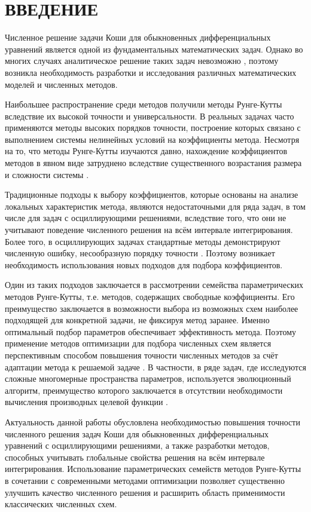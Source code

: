 \section{\centering ВВЕДЕНИЕ}
Численное решение задачи Коши для обыкновенных дифференциальных уравнений является одной из фундаментальных математических задач. Однако во многих случаях аналитическое решение таких задач невозможно \cite{Verzhbitsky}, поэтому возникла необходимость разработки и исследования различных математических моделей и численных методов. 

Наибольшее распространение среди методов получили методы Рунге-Кутты вследствие их высокой точности и универсальности. В реальных задачах часто применяются методы высоких порядков точности, построение которых связано с выполнением системы нелинейных условий на коэффициенты метода. Несмотря на то, что методы Рунге-Кутты изучаются давно, нахождение коэффициентов методов в явном виде затруднено вследствие существенного возрастания размера и сложности системы \cite{Demidovich}. 

Традиционные подходы к выбору коэффициентов, которые основаны на анализе локальных характеристик метода, являются недостаточными для ряда задач, в том числе для задач с осциллирующими решениями, вследствие того, что они не учитывают поведение численного решения на всём интервале интегрирования. Более того, в осциллирующих задачах стандартные методы демонстрируют численную ошибку, несообразную порядку точности \cite{article2023}. Поэтому возникает необходимость использования новых подходов для подбора коэффициентов.

Один из таких подходов заключается в рассмотрении семейства параметрических методов Рунге-Кутты, т.е. методов, содержащих свободные коэффициенты. Его преимущество заключается в возможности выбора из возможных схем наиболее подходящей для конкретной задачи, не фиксируя метод заранее. Именно оптимальный подбор параметров обеспечивает эффективность метода. Поэтому применение методов оптимизации для подбора численных схем является перспективным способом повышения точности численных методов за счёт адаптации метода к решаемой задаче \cite{article2023}. В частности, в ряде задач, где исследуются сложные многомерные пространства параметров, используется эволюционный алгоритм, преимущество которого заключается в отсутствии необходимости вычисления производных целевой функции \cite{article2025}.

Актуальность данной работы обусловлена необходимостью повышения точности численного решения задач Коши для обыкновенных дифференциальных уравнений с осциллирующими решениями, а также разработки методов, способных учитывать глобальные свойства решения на всём интервале интегрирования. Использование параметрических семейств методов Рунге-Кутты в сочетании с современными методами оптимизации позволяет существенно улучшить качество численного решения и расширить область применимости классических численных схем.

